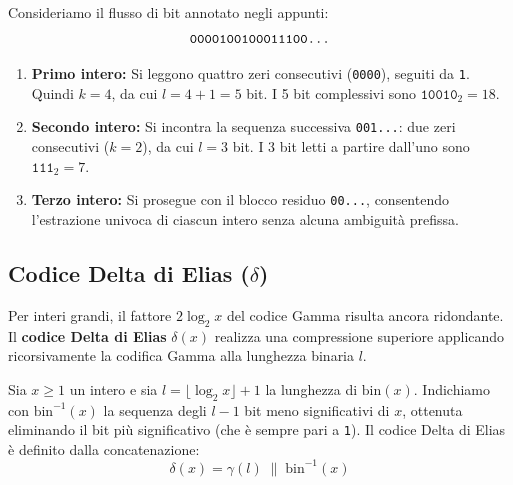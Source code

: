 \begin{example}
Consideriamo il flusso di bit annotato negli appunti:
\begin{equation*}
  \texttt{0000100100011100\dots}
\end{equation*}
\begin{enumerate}
  \item \textbf{Primo intero:} Si leggono quattro zeri consecutivi (\texttt{0000}), seguiti da \texttt{1}. Quindi $k = 4$, da cui $l = 4 + 1 = 5$ bit. I 5 bit complessivi sono $\texttt{10010}_2 = 18$.
  \item \textbf{Secondo intero:} Si incontra la sequenza successiva \texttt{001...}: due zeri consecutivi ($k = 2$), da cui $l = 3$ bit. I 3 bit letti a partire dall'uno sono $\texttt{111}_2 = 7$.
  \item \textbf{Terzo intero:} Si prosegue con il blocco residuo \texttt{00...}, consentendo l'estrazione univoca di ciascun intero senza alcuna ambiguit\`a prefissa.
\end{enumerate}
\end{example}

\FloatBarrier
\subsection{Codice Delta di Elias ($\delta$)}
\label{subsec:elias-delta}

Per interi grandi, il fattore $2\log_2 x$ del codice Gamma risulta ancora ridondante. Il \textbf{codice Delta di Elias} $\delta(x)$ realizza una compressione superiore applicando ricorsivamente la codifica Gamma alla lunghezza binaria $l$.

\begin{definition}
Sia $x \ge 1$ un intero e sia $l = \lfloor \log_2 x \rfloor + 1$ la lunghezza di $\text{bin}(x)$. Indichiamo con $\text{bin}^{-1}(x)$ la sequenza degli $l - 1$ bit meno significativi di $x$, ottenuta eliminando il bit pi\`u significativo (che \`e sempre pari a \texttt{1}).
Il codice Delta di Elias \`e definito dalla concatenazione:
\begin{equation}
  \delta(x) = \gamma(l) \;\|\; \text{bin}^{-1}(x)
\end{equation}
\end{definition}

